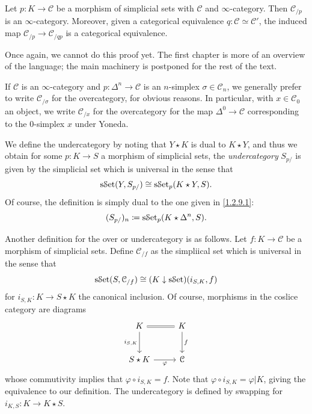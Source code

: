 \begin{proposition}\label{1.2.9.2}
	Let $p : K \to \mathcal{C} $ be a morphism of simplicial sets with $\mathcal{C} $ and $\infty $-category. Then $\mathcal{C} _{/p} $ is an $\infty $-category. Moreover, given a categorical equivalence $q : \mathcal{C} \simeq \mathcal{C} '$, the induced map $\mathcal{C} _{/p} \to \mathcal{C} _{/qp} $ is a categorical equivalence.
\end{proposition}

Once again, we cannot do this proof yet. The first chapter is more of an overview of the language; the main machinery is postponed for the rest of the text.

\begin{notation}\label{1.2.9.3}
	If $\mathcal{C} $ is an $\infty $-category and $p : \Delta ^n \to \mathcal{C} $ is an $n$-simplex $\sigma \in \mathcal{C} _n$, we generally prefer to write $\mathcal{C} _{/\sigma } $ for the overcategory, for obvious reasons. In particular, with $x\in \mathcal{C} _0$ an object, we write $\mathcal{C} _{/x} $ for the overcategory for the map $\Delta ^0\to \mathcal{C} $ corresponding to the $0$-simplex $x$ under Yoneda.
\end{notation}

\begin{remark}\label{1.2.9.4}
	We define the undercategory by noting that $Y\star K$ is dual to $K\star Y$, and thus we obtain for some $p : K \to S$ a morphism of simplicial sets, the \emph{undercategory} $S_{p/} $ is given by the simplicial set which is universal in the sense that
	\[
		\mathrm{s}\mathcal{S}\mathrm{et} (Y,S_{p/} )\cong \mathrm{s}\mathcal{S}\mathrm{et} _p(K\star Y,S)
	.\]
	Of course, the definition is simply dual to the one given in \cref{1.2.9.1}:
	\[
		(S_{p/} )_n\coloneqq \mathrm{s}\mathcal{S}\mathrm{et}_p(K\star \Delta ^n,S)
	.\]
\end{remark}

\begin{remark}\label{1.2.9.5}
	Another definition for the over or undercategory is as follows. Let $f : K \to \mathcal{C} $ be a morphism of simplicial sets. Define $\mathcal{C} _{/f} $ as the simpliical set which is universal in the sense that
	\[
		\mathrm{s}\mathcal{S}\mathrm{et} (S,\mathcal{C} _{/f} )\cong (K\downarrow \mathrm{s}\mathcal{S}\mathrm{et} )(i_{S,K} ,f)
	\]
	for $i_{S,K} : K \to S\star K$ the canonical inclusion. Of course, morphisms in the coslice category are diagrams
	\[\begin{tikzcd}[row sep = 2.5em, column sep = 2.5em]
	K\ar[equals, r] \ar[" i_{S\text{,} K}  "', d]  & K\ar[" f ", d]  \\
	S\star K\ar[" \varphi  "', r]  & \mathcal{C} 
	\end{tikzcd}\]
whose commutivity implies that $\varphi \circ i_{S,K} =f$. Note that $\varphi \circ i_{S,K} =\varphi |K$, giving the equivalence to our definition. The undercategory is defined by swapping for $i_{K,S} : K \to K\star S$.
\end{remark}

